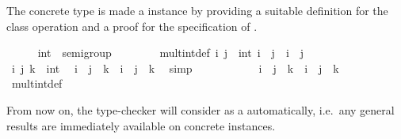 \begin{isabellebody}
\begin{isamarkuptext}
\end{isamarkuptext}%
\isamarkuptrue%
%
\isamarkuptrue%
%
\begin{isamarkuptext}%
The concrete type  is made a 
  instance by providing a suitable definition for the class operation
   and a proof for the specification of .%
\end{isamarkuptext}%
\isamarkuptrue%
\ \ \ \ \isamarkupfalse%
\ int\ {\isacharcolon}{\isacharcolon}\ semigroup\isanewline
\ \ \ \ \ \ \ \ mult{\isacharunderscore}int{\isacharunderscore}def{\isacharcolon}\ {\isachardoublequoteopen}{\isasymAnd}i\ j\ {\isacharcolon}{\isacharcolon}\ int{\isachardot}\ i\ {\isasymotimes}\ j\ {\isasymequiv}\ i\ {\isacharplus}\ j{\isachardoublequoteclose}\isanewline
%
\isadelimproof
\ \ \ \ %
\endisadelimproof
%
\isatagproof
{}\isamarkupfalse%
\isanewline
\ \ \ \ \ \ \ \ \isamarkupfalse%
\ i\ j\ k\ {\isacharcolon}{\isacharcolon}\ int\ \isamarkupfalse%
\ {\isachardoublequoteopen}{\isacharparenleft}i\ {\isacharplus}\ j{\isacharparenright}\ {\isacharplus}\ k\ {\isacharequal}\ i\ {\isacharplus}\ {\isacharparenleft}j\ {\isacharplus}\ k{\isacharparenright}{\isachardoublequoteclose}\ \isamarkupfalse%
\ simp\isanewline
\ \ \ \ \ \ \ \ \isamarkupfalse%
\ \isamarkupfalse%
\ {\isachardoublequoteopen}{\isacharparenleft}i\ {\isasymotimes}\ j{\isacharparenright}\ {\isasymotimes}\ k\ {\isacharequal}\ i\ {\isasymotimes}\ {\isacharparenleft}j\ {\isasymotimes}\ k{\isacharparenright}{\isachardoublequoteclose}\ \isamarkupfalse%
\ mult{\isacharunderscore}int{\isacharunderscore}def\ \isacommand{{\isachardot}}\isamarkupfalse%
\isanewline
\ \ \ \ \isamarkupfalse%
%
\endisatagproof
{\isafoldproof}%
%
\isadelimproof
%
\endisadelimproof
%
\begin{isamarkuptext}%
\noindent From now on, the type-checker will consider 
  as a  automatically, i.e.\ any general results
  are immediately available on concrete instances.


\end{isamarkuptext}
\end{isabellebody}
